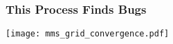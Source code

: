 \documentclass[mathserif]{beamer}
\begin{document}
 \begin{frame}
   \frametitle{This Process Finds Bugs}
      \begin{center}
        \texttt{[image: mms\_grid\_convergence.pdf]} \\
      \end{center}

 \end{frame}



\end{document}
